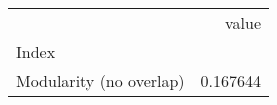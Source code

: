 \begin{tabular}{lr}
\toprule
{} &     value \\
Index                   &           \\
\midrule
Modularity (no overlap) &  0.167644 \\
\bottomrule
\end{tabular}
